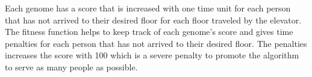 






Each genome has a score that is increased with one time unit for each person that has not arrived to their desired floor for each floor traveled by the elevator. The fitness function helps to keep track of each genome's score and gives time penalties for each person that has not arrived to their desired floor. The penalties increases the score with 100 which is a severe penalty to promote the algorithm to serve as many people as possible.


